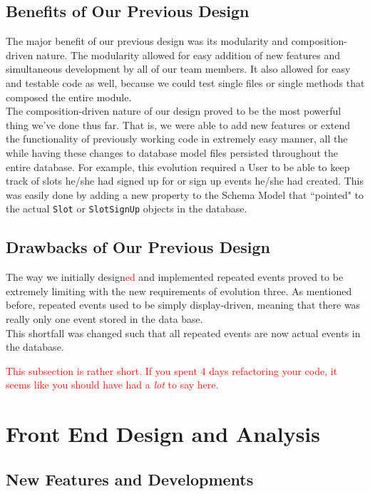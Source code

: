 \documentclass[11pt]{article}   %
\newcommand{\dcomment}[1]{\textcolor{red}{#1}}
\begin{document}
\subsection{Benefits of Our Previous Design}
The major benefit of our previous design was its modularity and composition-driven nature. The modularity allowed for easy addition of new features and simultaneous development by all of our team members. It also allowed for easy and testable code as well, because we could test single files or single methods that composed the entire module.\\

\noindent The composition-driven nature of our design proved to be the most powerful thing we've done thus far. That is, we were able to add new features or extend the functionality of previously working code in extremely easy manner, all the while having these changes to database model files persisted throughout the entire database. For example, this evolution required a User to be able to keep track of slots he/she had signed up for or sign up events he/she had created. This was easily done by adding a new property to the Schema Model that ``pointed" to the actual \texttt{Slot} or \texttt{SlotSignUp} objects in the database.

\subsection{Drawbacks of Our Previous Design}
The way we initially design\dcomment{ed} and implemented repeated events proved to be extremely limiting with the new requirements of evolution three. As mentioned before, repeated events used to be simply display-driven, meaning that there was really only one event stored in the data base.\\

\noindent This shortfall was changed such that all repeated events are now actual events in the database.

\dcomment{This subsection is rather short.  If you spent 4 days refactoring your code, it seems
  like you should have had a \emph{lot} to say here.}

\section{Front End Design and Analysis}

\subsection{New Features and Developments}
\end{document}
